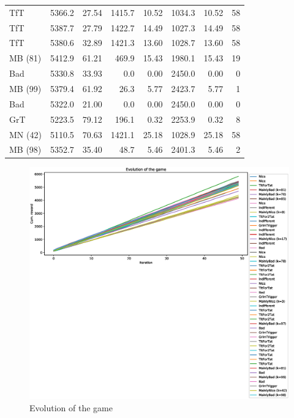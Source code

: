\documentclass[journal,a4paper,10pt,twoside]{IEEEtran} %
\begin{document}
\begin{table}[ht]
\begin{tabular}{lrrrrrrr}
    	     TfT &   5366.2 & 27.54 &   1415.7 & 10.52 &   1034.3 & 10.52 &    58 \\
    	     TfT &   5387.7 & 27.79 &   1422.7 & 14.49 &   1027.3 & 14.49 &    58 \\
    	     TfT &   5380.6 & 32.89 &   1421.3 & 13.60 &   1028.7 & 13.60 &    58 \\
    	 MB (81) &   5412.9 & 61.21 &    469.9 & 15.43 &   1980.1 & 15.43 &    19 \\
    	     Bad &   5330.8 & 33.93 &      0.0 &  0.00 &   2450.0 &  0.00 &     0 \\
    	 MB (99) &   5379.4 & 61.92 &     26.3 &  5.77 &   2423.7 &  5.77 &     1 \\
    	     Bad &   5322.0 & 21.00 &      0.0 &  0.00 &   2450.0 &  0.00 &     0 \\
    	     GrT &   5223.5 & 79.12 &    196.1 &  0.32 &   2253.9 &  0.32 &     8 \\
    	 MN (42) &   5110.5 & 70.63 &   1421.1 & 25.18 &   1028.9 & 25.18 &    58 \\
    	 MB (98) &   5352.7 & 35.40 &     48.7 &  5.46 &   2401.3 &  5.46 &     2 \\ \bottomrule
    \end{tabular}
\end{table}

\begin{figure}[!ht]
    \centering
    \includegraphics[width=1\columnwidth]{../img/ipdmp/ipdmp-evolution-of-game-50}
    \caption{Evolution of the game}
    \label{fig:boxIPDMPevo}
\end{figure}
\end{document}
